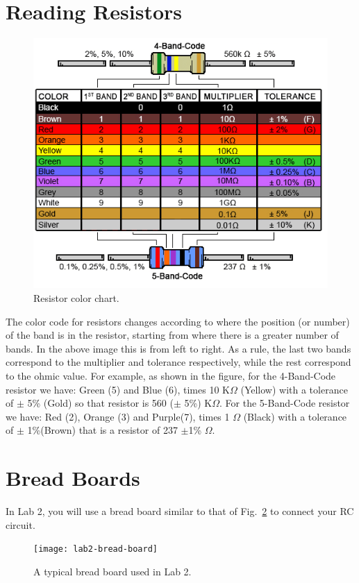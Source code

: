 \documentclass[12pt]{report}
\begin{document}
\begin{appendix}
\section{Reading Resistors}
\begin{figure}[h]
	\centering
	\includegraphics[scale=1.0]{appendix-resistor-chart.png}
	\caption{Resistor color chart.}
	\label{Fig:resistor-chart}
\end{figure}

The color code for resistors changes according to where the position (or number) of the band is in the resistor, starting from where there is a greater number of bands. In the above image this is from left to right. As a rule, the last two bands correspond to the multiplier and tolerance respectively, while the rest correspond to the ohmic value. For example, as shown in the figure, for the 4-Band-Code resistor we have: Green (5) and Blue (6), times 10 K$\Omega$ (Yellow) with a tolerance of $\pm$ 5\% (Gold) so that resistor is 560 ($\pm$ 5\%)  K$\Omega$. For the 5-Band-Code resistor we have: Red (2), Orange (3) and Purple(7), times 1 $\Omega$ (Black) with a tolerance of  $\pm$ 1\%(Brown) that is a resistor of 237 $\pm$1\% $\Omega$.

\section{Bread Boards}
In Lab 2, you will use a bread board similar to that of Fig.~\ref{Fig:lab2-bread-board} to connect your RC circuit.
\begin{figure}[h]
\centering
\texttt{[image: lab2-bread-board]}
\caption{A typical bread board used in Lab 2.}
\label{Fig:lab2-bread-board}
\end{figure}


\end{appendix}
\end{document}
